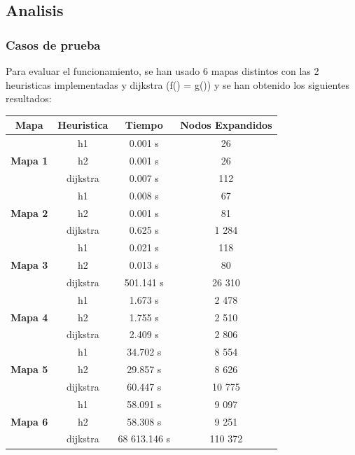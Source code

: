\documentclass[11pt,spanish]{article}
\begin{document}
	\subsection{Analisis}
		\subsubsection{Casos de prueba}
			Para evaluar el funcionamiento, se han usado 6 mapas distintos con las 2 heuristicas implementadas y dijkstra (f() = g()) y se han obtenido los siguientes resultados:\\
			\begin{center}
			\begin{tabular}{|c||c|c|c|}
				\hline
				\textbf{Mapa}&\textbf{Heuristica}&\textbf{Tiempo}&\textbf{Nodos Expandidos}\\
				\hline
				\hline
				\multirow{3}{*}{\textbf{Mapa 1}} & h1 & 0.001 s & 26\\
												& h2 & 0.001 s & 26\\
												& dijkstra & 0.007 s & 112\\
				\hline
				\multirow{3}{*}{\textbf{Mapa 2}} & h1 & 0.008 s & 67\\
												& h2 & 0.001 s & 81\\
												& dijkstra & 0.625 s & 1 284\\
				\hline
				\multirow{3}{*}{\textbf{Mapa 3}} & h1 & 0.021 s & 118\\
												& h2 & 0.013 s & 80\\
												& dijkstra & 501.141 s & 26 310\\
				\hline
				\multirow{3}{*}{\textbf{Mapa 4}} & h1 & 1.673 s & 2 478\\
												& h2 & 1.755 s & 2 510\\
												& dijkstra & 2.409 s & 2 806\\
				\hline
				\multirow{3}{*}{\textbf{Mapa 5}} & h1 & 34.702 s & 8 554\\
												& h2 & 29.857 s & 8 626\\
												& dijkstra & 60.447 s & 10 775\\
				\hline
				\multirow{3}{*}{\textbf{Mapa 6}} & h1 & 58.091 s & 9 097\\
												& h2 & 58.308 s & 9 251\\
												& dijkstra & 68 613.146 s & 110 372\\
				\hline
			\end{tabular}
			\end{center}
\end{document}
